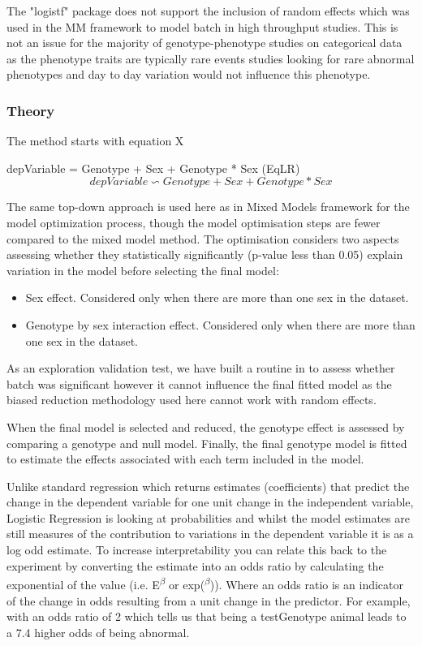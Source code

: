 \documentclass[12pt,a4paper]{article}
\begin{document}
The "logistf" package does not support the inclusion of random effects which was used in the MM framework to model batch in high throughput studies. This is not an issue for the majority of genotype-phenotype studies on categorical data as the phenotype traits are typically rare events studies looking for rare abnormal phenotypes and day to day variation would not influence this phenotype. 

\subsubsection{Theory}
The method starts with equation X

depVariable =  Genotype + Sex + Genotype * Sex 	(EqLR)
\[
depVariable \backsim Genotype + Sex +
Genotype*Sex \tag{Eq5}\label{EqLR}
\]

The same top-down approach is used here as in Mixed Models framework for the model optimization process, though the model optimisation steps are fewer compared to the mixed model method.  The optimisation considers two aspects assessing whether they statistically significantly (p-value less than 0.05) explain variation in the model before selecting the final model: 

\begin{itemize}
\item Sex effect. Considered only when there are more than one sex in the dataset.
\item Genotype by sex interaction effect. Considered only when there are more than one sex in the dataset.
\end{itemize}
As an exploration validation test, we have built a routine in to assess whether batch was significant however it cannot influence the final fitted model as the biased reduction methodology used here cannot work with random effects.

When the final model is selected and reduced, the genotype effect is assessed by comparing a genotype and null model. Finally, the final genotype model is fitted to estimate the effects associated with each term included in the model.

Unlike standard regression which returns estimates (coefficients) that predict the change in the dependent variable for one unit change in the independent variable, Logistic Regression is looking at probabilities and whilst the model estimates are still measures of the contribution to variations in the dependent variable it is as a log odd estimate. To increase interpretability you can relate this back to the experiment by converting the estimate into an odds ratio by calculating the exponential of the value (i.e. E\textsuperscript{$\beta$} or exp(\textsuperscript{$\beta$})). Where an odds ratio is an indicator of the change in odds resulting from a unit change in the predictor. For example, with an odds ratio of 2 which tells us that being a testGenotype animal leads to a 7.4 higher odds of being abnormal.
\end{document}
